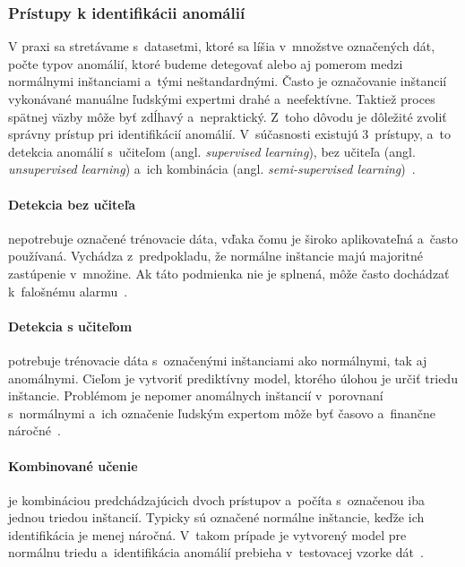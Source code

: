 \documentclass[a4paper,twoside,slovak,12pt,appendix]{article}
\begin{document}
\subsubsection{Prístupy k identifikácii anomálií}
V praxi sa stretávame s~datasetmi, ktoré sa líšia v~množstve označených dát,
počte typov anomálií, ktoré budeme detegovať alebo aj pomerom medzi normálnymi
inštanciami a~tými neštandardnými. Často je označovanie inštancií vykonávané
manuálne ľudskými expertmi drahé a~neefektívne. Taktiež proces spätnej väzby
môže byť zdĺhavý a~nepraktický. Z~toho dôvodu je dôležité zvoliť správny
prístup pri identifikácií anomálií. V~súčasnosti existujú 3~prístupy, a~to
detekcia anomálií s~učiteľom (angl. \textit{supervised learning}), bez učiteľa
(angl. \textit{unsupervised learning}) a~ich kombinácia (angl.
\textit{semi-supervised learning})~\cite{Chandola2009}.

\paragraph{Detekcia bez učiteľa} nepotrebuje označené trénovacie dáta, vďaka
čomu je široko aplikovateľná a~často používaná. Vychádza z~predpokladu, že
normálne inštancie majú majoritné zastúpenie v~množine. Ak táto podmienka nie je
splnená, môže často dochádzať k~falošnému alarmu~\cite{Chandola2009}.

\paragraph{Detekcia s učiteľom} potrebuje trénovacie dáta s~označenými
inštanciami ako normálnymi, tak aj anomálnymi. Cieľom je vytvoriť prediktívny
model, ktorého úlohou je určiť triedu inštancie. Problémom je nepomer anomálnych
inštancií v~porovnaní s~normálnymi a~ich označenie ľudským expertom môže byť
časovo a~finančne náročné~\cite{Chandola2009}.

\paragraph{Kombinované učenie} je kombináciou predchádzajúcich dvoch prístupov
a~počíta s~označenou iba jednou triedou inštancií. Typicky sú označené normálne
inštancie, keďže ich identifikácia je menej náročná. V~takom prípade je
vytvorený model pre normálnu triedu a~identifikácia anomálií prebieha
v~testovacej vzorke dát~\cite{Chandola2009}.

\end{document}

